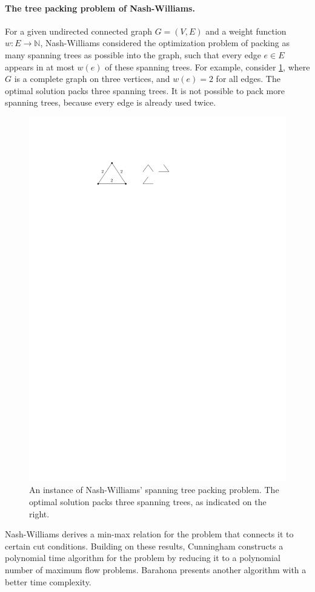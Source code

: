 \documentclass[runningheads]{llncs}
\newcommand{\NN}{\mathbb{N}}
\newcommand{\lasse}[1]{#1}
\begin{document}
\paragraph{The tree packing problem of Nash-Williams.}
For a given undirected connected graph $G=(V,E)$ and a weight function $w:E\to\NN$,
Nash-Williams \cite{Nash-Williams1961} considered \lasse{the optimization problem of packing as many 
spanning trees as possible into the graph, such that every edge $e \in E$ appears in at most $w(e)$ of these spanning trees. 
For example, consider \cref{fig_spt_example}, where $G$ is a complete graph on three vertices, 
and $w(e) = 2$ for all edges. The optimal solution packs three spanning trees. It is not possible to pack more spanning trees, because every edge is already used twice.} 
\begin{figure}[htpb]
\centering
\includegraphics[scale=1]{stp-example}
\caption{\lasse{An instance of Nash-Williams' spanning tree packing problem. The optimal solution packs three spanning trees, as indicated on the right.}}
\label{fig_spt_example}
\end{figure}
Nash-Williams \cite{Nash-Williams1961} derives a min-max relation for the problem that connects it to certain cut conditions.
Building on these results, Cunningham \cite{Cunningham1985} constructs a polynomial time 
algorithm for the problem by reducing it to a polynomial number of maximum flow problems.
Barahona \cite{Barahona1995} presents another algorithm with a better time complexity.
\end{document}
